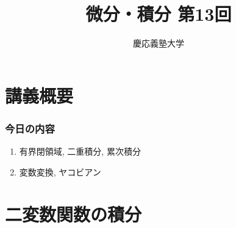 \documentclass[dvipdfmx,cjk,10.2pt]{beamer}
\theoremstyle{definition}
\begin{document}
\title{微分・積分 第13回} 
\author{慶応義塾大学}            %
\date{}



\begin{frame}                  %
\titlepage                     %
\end{frame}








\section{講義概要}


\begin{frame}
\frametitle{今日の内容}



\begin{enumerate}
\item 有界閉領域, 二重積分, 累次積分
\item 変数変換, ヤコビアン
\end{enumerate} 



\end{frame}









\section{二変数関数の積分}
\end{document}
